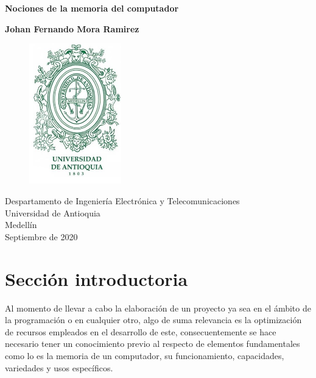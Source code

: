\documentclass{article}
\begin{document}
\begin{titlepage}
    \begin{center}
        \vspace*{1cm}
            
        \Huge
        \textbf{Nociones de la memoria del computador}
            
        \vspace{0.5cm}
        \LARGE
        
        
            
        \vspace{1.5cm}
            
        \textbf{Johan Fernando Mora Ramirez}
        
         \vspace{1.5cm}
         \begin{figure}[h]
        \includegraphics[width=4cm]{EscudoUdea.jpg}
        \centering
       
        \label{fig:EscudoUdea}
        \end{figure}
            
        \vfill
            
        \vspace{0.8cm}
            
        \Large
        Despartamento de Ingeniería Electrónica y Telecomunicaciones\\
        Universidad de Antioquia\\
        Medellín\\
        Septiembre de 2020
            
    \end{center}
\end{titlepage}

\tableofcontents
\newpage
\section{Sección introductoria}\label{intro}
Al momento de llevar a cabo la elaboración de un proyecto ya sea en el ámbito de la programación o en cualquier otro, algo de suma relevancia es la optimización de recursos empleados en el desarrollo de este, consecuentemente se hace necesario tener un conocimiento previo al respecto de elementos fundamentales como lo es la memoria de un computador, su funcionamiento, capacidades, variedades y usos específicos.
\end{document}
